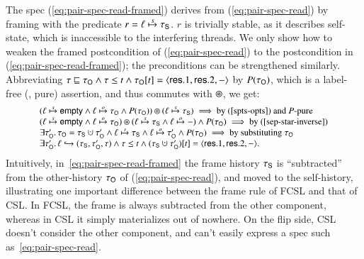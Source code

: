 The spec (\ref{eq:pair-spec-read-framed}) derives from
(\ref{eq:pair-spec-read}) by framing with the predicate $r = \hps
\spts \histS$. $r$ is trivially stable, as it describes self-state,
which is inaccessible to the interfering threads. We only show how to
weaken the framed postcondition of (\ref{eq:pair-spec-read}) to the
postcondition in (\ref{eq:pair-spec-read-framed}); the preconditions
can be strengthened similarly. Abbreviating $\hist \pre \histO \aand
\hist \le t \aand \inat{\angled{\res.1, \res.2, -}}{\histO}{t}$ by
$P(\histO)$, which is a label-free (\ie, pure) assertion, and thus
commutes with $\ssep$, we get:
\[
{\small
\begin{array}{l}
(\hps \spts \hempty \aand \hps \opts \histO \aand P(\histO)) \ssep (\hps \spts \histS) \implies \mbox{by (\ref{spts-opts}) and $P$-pure}\\
(\hps \spts \hempty \aand \hps \opts \histO) \ssep (\hps \spts \histS \aand \hps \opts -) \aand P(\histO) \implies \mbox{by (\ref{sep-star-inverse})}\\
\exists \histO'\ldot \histO = \histS \hunion \histO' \aand 
\hps \spts \histS \aand \hps \opts \histO' \aand P(\histO) \implies \mbox{by substituting $\histO$}\\
\exists \histO'\ldot \histso{\hps}{\histS, \histO', \hist} \aand \hist \le t \aand \inat{\angled{\res.1, \res.2, -}}{(\histS \hunion \histO')}{t}.
\end{array}}
\]
Intuitively, in~\eqref{eq:pair-spec-read-framed} the frame history
$\histS$ is ``subtracted'' from the other-history $\histO$ of
(\ref{eq:pair-spec-read}), and moved to the self-history, illustrating
one important difference between the frame rule of FCSL and that of
CSL. In FCSL, the frame is always subtracted from the other component,
whereas in CSL it simply materializes out of nowhere. On the flip
side, CSL doesn't consider the other component, and can't easily
express a spec such as~\eqref{eq:pair-spec-read}.

